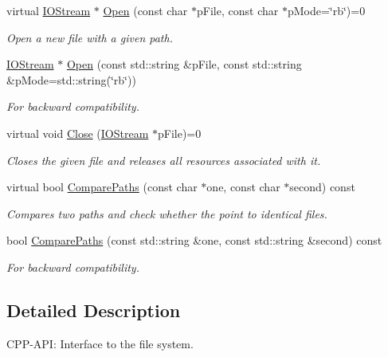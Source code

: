 \begin{DoxyCompactItemize}
virtual \hyperlink{classAssimp_1_1IOStream}{\-I\-O\-Stream} $\ast$ \hyperlink{classAssimp_1_1IOSystem_ac512ece3b0701de5682553007a4c0816}{\-Open} (const char $\ast$p\-File, const char $\ast$p\-Mode=\char`\"{}rb\char`\"{})=0
\begin{DoxyCompactList}\small\item\em \-Open a new file with a given path. \end{DoxyCompactList}\item 
\hyperlink{classAssimp_1_1IOStream}{\-I\-O\-Stream} $\ast$ \hyperlink{classAssimp_1_1IOSystem_aef35fabc9bd49fb83bfd4f12a94083c3}{\-Open} (const std\-::string \&p\-File, const std\-::string \&p\-Mode=std\-::string(\char`\"{}rb\char`\"{}))
\begin{DoxyCompactList}\small\item\em \-For backward compatibility. \end{DoxyCompactList}\item 
virtual void \hyperlink{classAssimp_1_1IOSystem_a8c334d60f04bceeb6bd0157d21723f3e}{\-Close} (\hyperlink{classAssimp_1_1IOStream}{\-I\-O\-Stream} $\ast$p\-File)=0
\begin{DoxyCompactList}\small\item\em \-Closes the given file and releases all resources associated with it. \end{DoxyCompactList}\item 
virtual bool \hyperlink{classAssimp_1_1IOSystem_a11349a65b353ed62f655c3dd802b9062}{\-Compare\-Paths} (const char $\ast$one, const char $\ast$second) const 
\begin{DoxyCompactList}\small\item\em \-Compares two paths and check whether the point to identical files. \end{DoxyCompactList}\item 
bool \hyperlink{classAssimp_1_1IOSystem_a279d1d4b0b2aa37800e222aad508dff1}{\-Compare\-Paths} (const std\-::string \&one, const std\-::string \&second) const 
\begin{DoxyCompactList}\small\item\em \-For backward compatibility. \end{DoxyCompactList}\end{DoxyCompactItemize}


\subsection{\-Detailed \-Description}
\-C\-P\-P-\/\-A\-P\-I\-: \-Interface to the file system. 

